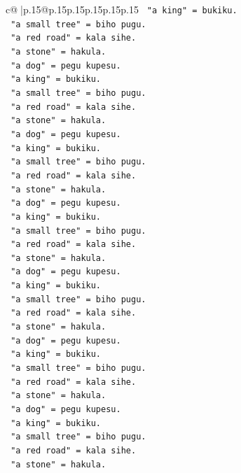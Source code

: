 \documentclass{article}
\begin{document}
{\begin{supertabular}{c@{$\;$}|p{.15\linewidth}@{}p{.15\linewidth}p{.15\linewidth}p{.15\linewidth}p{.15\linewidth}p{.15\linewidth}}
{{{\texttt{   "a king" = bukiku.} \\
\texttt{   "a small tree" = biho pugu.} \\
\texttt{   "a red road" = kala sihe.} \\
\texttt{   "a stone" = hakula.} \\
\texttt{   "a dog" = pegu kupesu.} \\
\texttt{   "a king" = bukiku.} \\
\texttt{   "a small tree" = biho pugu.} \\
\texttt{   "a red road" = kala sihe.} \\
\texttt{   "a stone" = hakula.} \\
\texttt{   "a dog" = pegu kupesu.} \\
\texttt{   "a king" = bukiku.} \\
\texttt{   "a small tree" = biho pugu.} \\
\texttt{   "a red road" = kala sihe.} \\
\texttt{   "a stone" = hakula.} \\
\texttt{   "a dog" = pegu kupesu.} \\
\texttt{   "a king" = bukiku.} \\
\texttt{   "a small tree" = biho pugu.} \\
\texttt{   "a red road" = kala sihe.} \\
\texttt{   "a stone" = hakula.} \\
\texttt{   "a dog" = pegu kupesu.} \\
\texttt{   "a king" = bukiku.} \\
\texttt{   "a small tree" = biho pugu.} \\
\texttt{   "a red road" = kala sihe.} \\
\texttt{   "a stone" = hakula.} \\
\texttt{   "a dog" = pegu kupesu.} \\
\texttt{   "a king" = bukiku.} \\
\texttt{   "a small tree" = biho pugu.} \\
\texttt{   "a red road" = kala sihe.} \\
\texttt{   "a stone" = hakula.} \\
\texttt{   "a dog" = pegu kupesu.} \\
\texttt{   "a king" = bukiku.} \\
\texttt{   "a small tree" = biho pugu.} \\
\texttt{   "a red road" = kala sihe.} \\
\texttt{   "a stone" = hakula.} \\
}}}
\end{supertabular}}
\end{document}
